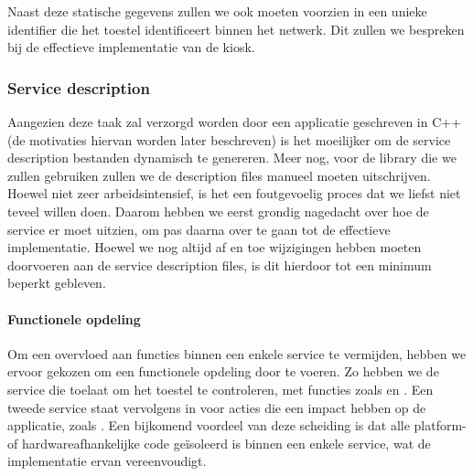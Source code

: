 Naast deze statische gegevens zullen we ook moeten voorzien in een unieke identifier die het toestel identificeert binnen het netwerk. Dit zullen we bespreken bij de effectieve implementatie van de kiosk.

\subsubsection{Service description}

Aangezien deze taak zal verzorgd worden door een applicatie geschreven in C++ (de motivaties hiervan worden later beschreven) is het moeilijker om de service description bestanden dynamisch te genereren. Meer nog, voor de library die we zullen gebruiken zullen we de description files manueel moeten uitschrijven. Hoewel niet zeer arbeidsintensief, is het een foutgevoelig proces dat we liefst niet teveel willen doen. Daarom hebben we eerst grondig nagedacht over hoe de service er moet uitzien, om pas daarna over te gaan tot de effectieve implementatie. Hoewel we nog altijd af en toe wijzigingen hebben moeten doorvoeren aan de service description files, is dit hierdoor tot een minimum beperkt gebleven.

\paragraph{Functionele opdeling}

Om een overvloed aan functies binnen een enkele service te vermijden, hebben we ervoor gekozen om een functionele opdeling door te voeren. Zo hebben we de service die toelaat om het toestel te controleren, met functies zoals  en . Een tweede service staat vervolgens in voor acties die een impact hebben op de applicatie, zoals . Een bijkomend voordeel van deze scheiding is dat alle platform- of hardwareafhankelijke code geïsoleerd is binnen een enkele service, wat de implementatie ervan vereenvoudigt.

